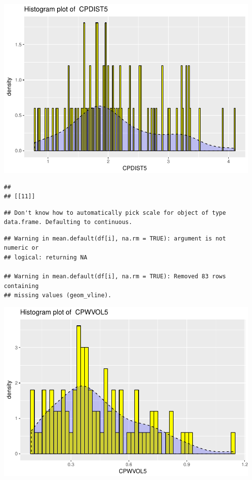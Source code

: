 \documentclass[]{article}
\begin{document}
\includegraphics{Desc_stats_files/figure-latex/unnamed-chunk-2-10.pdf}

\begin{verbatim}
## 
## [[11]]
\end{verbatim}

\begin{verbatim}
## Don't know how to automatically pick scale for object of type data.frame. Defaulting to continuous.
\end{verbatim}

\begin{verbatim}
## Warning in mean.default(df[i], na.rm = TRUE): argument is not numeric or
## logical: returning NA

## Warning in mean.default(df[i], na.rm = TRUE): Removed 83 rows containing
## missing values (geom_vline).
\end{verbatim}

\includegraphics{Desc_stats_files/figure-latex/unnamed-chunk-2-11.pdf}
\end{document}
